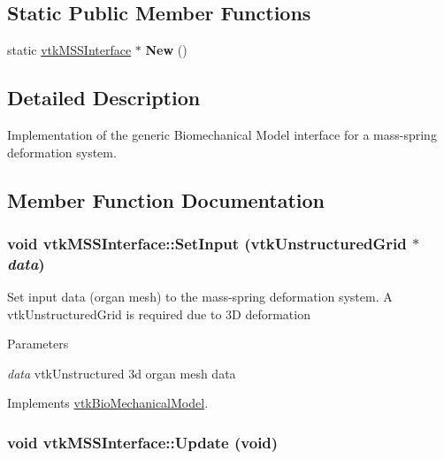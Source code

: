 \subsection*{Static Public Member Functions}
\begin{DoxyCompactItemize}
\item 
\hypertarget{classvtkMSSInterface_a7713b1d53daffc5c9df7da3c8629bae3}{
static \hyperlink{classvtkMSSInterface}{vtkMSSInterface} $\ast$ {\bfseries New} ()}
\label{classvtkMSSInterface_a7713b1d53daffc5c9df7da3c8629bae3}

\end{DoxyCompactItemize}


\subsection{Detailed Description}
Implementation of the generic Biomechanical Model interface for a mass-\/spring deformation system. 

\subsection{Member Function Documentation}
\hypertarget{classvtkMSSInterface_a34c770467bd94f9323e956f0fc36c2f4}{
\subsubsection[{SetInput}]{\setlength{\rightskip}{0pt plus 5cm}void vtkMSSInterface::SetInput (vtkUnstructuredGrid $\ast$ {\em data})}}
\label{classvtkMSSInterface_a34c770467bd94f9323e956f0fc36c2f4}


Set input data (organ mesh) to the mass-\/spring deformation system. A vtkUnstructuredGrid is required due to 3D deformation 
\begin{DoxyParams}{Parameters}
\item[{\em data}]vtkUnstructured 3d organ mesh data \end{DoxyParams}


Implements \hyperlink{classvtkBioMechanicalModel_ac729eb24ed495e450a16ce369ad70f69}{vtkBioMechanicalModel}.\hypertarget{classvtkMSSInterface_a542094518ae8779c3bad93206750de9b}{
\subsubsection[{Update}]{\setlength{\rightskip}{0pt plus 5cm}void vtkMSSInterface::Update (void)}}
\label{classvtkMSSInterface_a542094518ae8779c3bad93206750de9b}


